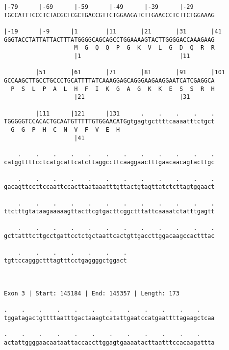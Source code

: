 \documentclass{article}
\begin{document}
\begin{Verbatim}
|-79      |-69      |-59      |-49      |-39      |-29      
TGCCATTTCCCTCTACGCTCGCTGACCGTTCTGGAAGATCTTGAACCCTCTTCTGGAAAG
                                                            
|-19      |-9      |1        |11       |21       |31       |41
GGGTACCTATTATTACTTTATGGGGCAGCAGCCTGGAAAAGTACTTGGGGACCAAAGAAG
                    M  G  Q  Q  P  G  K  V  L  G  D  Q  R  R
                    |1                            |11       
  
         |51       |61       |71       |81       |91       |101
GCCAAGCTTGCCTGCCCTGCATTTTATCAAAGGAGCAGGGAAGAAGGAATCATCGAGGCA
  P  S  L  P  A  L  H  F  I  K  G  A  G  K  K  E  S  S  R  H
                    |21                           |31       
  
         |111      |121      |131      .    .    .    .    .
TGGGGGTCCACACTGCAATGTTTTTGTGGAACATGgtgagtgcttttcaaaatttctgct
  G  G  P  H  C  N  V  F  V  E  H                           
                    |41                                     
  
    .    .    .    .    .    .    .    .    .    .    .    .
catggttttcctcatgcattcatcttaggccttcaaggaactttgaacaacagtacttgc
                                                            
    .    .    .    .    .    .    .    .    .    .    .    .
gacagttccttccaattccacttaataaatttgttactgtagttatctcttagtggaact
                                                            
    .    .    .    .    .    .    .    .    .    .    .    .
ttctttgtataagaaaaagttacttcgtgacttcggctttattcaaaatctatttgagtt
                                                            
    .    .    .    .    .    .    .    .    .    .    .    .
gcttatttcttgcctgattcctctgctaattcactgttgaccttggacaagccactttac
                                                            
    .    .    .    .    .    .    .
tgttccagggctttagtttcctgaggggctggact
                                   
                                   
 
Exon 3 | Start: 145184 | End: 145357 | Length: 173
 
.    .    .    .    .    .    .    .    .    .    .    .    
tggatagactgttttaatttgactaaagtcatattgaatccatgaattttagaagctcaa
                                                            
.    .    .    .    .    .    .    .    .    .    .    .    
actattggggaacaataattaccaccttggagtgaaaatacttaatttccacaagattta
                                                            

\end{Verbatim}
\end{document}

